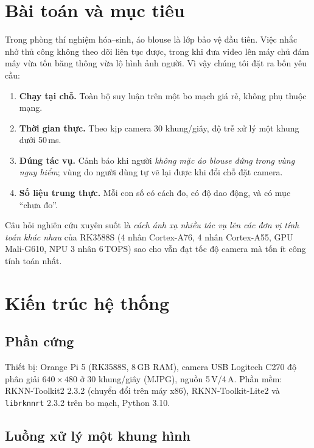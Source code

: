 \documentclass[12pt,a4paper]{article}
\begin{document}
\tableofcontents
\newpage

\section{Bài toán và mục tiêu}

Trong phòng thí nghiệm hóa--sinh, áo blouse là lớp bảo vệ đầu tiên. Việc nhắc nhở thủ công không theo dõi liên tục
được, trong khi đưa video lên máy chủ đám mây vừa tốn băng thông vừa lộ hình ảnh người. Vì vậy chúng tôi đặt ra
bốn yêu cầu:

\begin{enumerate}
  \item \textbf{Chạy tại chỗ.} Toàn bộ suy luận trên một bo mạch giá rẻ, không phụ thuộc mạng.
  \item \textbf{Thời gian thực.} Theo kịp camera 30 khung/giây, độ trễ xử lý một khung dưới 50\,ms.
  \item \textbf{Đúng tác vụ.} Cảnh báo khi người \emph{không mặc áo blouse đứng trong vùng nguy hiểm}; vùng do người
        dùng tự vẽ lại được khi đổi chỗ đặt camera.
  \item \textbf{Số liệu trung thực.} Mỗi con số có cách đo, có độ dao động, và có mục ``chưa đo''.
\end{enumerate}

Câu hỏi nghiên cứu xuyên suốt là \emph{cách ánh xạ nhiều tác vụ lên các đơn vị tính toán khác nhau} của
RK3588S (4 nhân Cortex-A76, 4 nhân Cortex-A55, GPU Mali-G610, NPU 3 nhân 6\,TOPS) sao cho vẫn đạt tốc độ camera mà tốn ít
công tính toán nhất.

\section{Kiến trúc hệ thống}

\subsection{Phần cứng}

Thiết bị: Orange Pi 5 (RK3588S, 8\,GB RAM), camera USB Logitech C270 độ phân giải $640\times480$ ở 30 khung/giây
(MJPG), nguồn 5\,V/4\,A. Phần mềm: RKNN-Toolkit2 2.3.2 (chuyển đổi trên máy x86), RKNN-Toolkit-Lite2 và \texttt{librknnrt}
2.3.2 trên bo mạch, Python 3.10.

\subsection{Luồng xử lý một khung hình}
\end{document}
